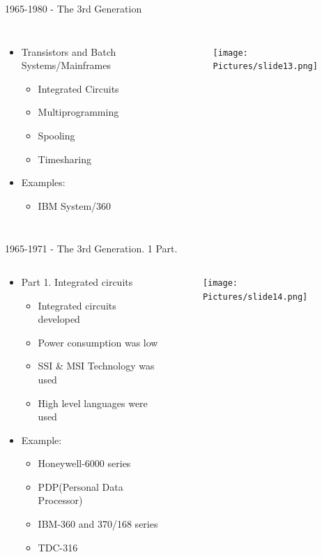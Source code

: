 \documentclass{beamer}
\begin{document}
\begin{frame}
{\centerline{1965-1980 - The 3rd Generation}}
\begin{columns}
\begin{itemize}
    \item Transistors and Batch Systems/Mainframes
    \begin{itemize}
        \item Integrated Circuits
        \item Multiprogramming
        \item Spooling
        \item Timesharing
    \end{itemize}
    \item Examples:
    \begin{itemize}
        \item IBM System/360
    \end{itemize}
\end{itemize}
\begin{figure}
    \centering
   \texttt{[image: Pictures/slide13.png]}
\end{figure}
\end{columns}
\end{frame}



\begin{frame}
{\centerline{1965-1971 - The 3rd Generation. 1 Part.}}
\begin{columns}
\begin{column}{0.5\textwidth}
\begin{itemize}
    \item Part 1. Integrated circuits
    \begin{itemize}
        \item Integrated circuits developed
        \item Power consumption was low
        \item SSI \& MSI Technology was used
        \item High level languages were used
    \end{itemize}
    \item Example:
    \begin{itemize}
        \item Honeywell-6000 series
        \item PDP(Personal Data Processor)
        \item IBM-360 and 370/168 series
        \item TDC-316
    \end{itemize}
\end{itemize}
\end{column}
\begin{column}{0.5\textwidth}
\begin{figure}
    \centering
    \texttt{[image: Pictures/slide14.png]}
\end{figure}
\end{column}
\end{columns}

\end{frame}
\end{document}
